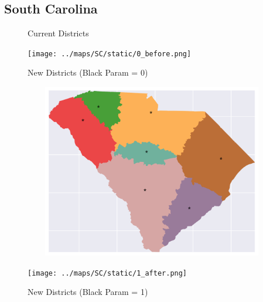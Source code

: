 \subsection{South Carolina}
\begin{figure}[htb!] \centering
\caption{ Current Districts }
\texttt{[image: ../maps/SC/static/0\_before.png]}
\caption{ New Districts (Black Param = 0) }
\includegraphics[width=5in,height=3in,keepaspectratio]{../maps/SC/static/0_after.png}
\caption{ New Districts (Black Param = 1) }
\texttt{[image: ../maps/SC/static/1\_after.png]}
\end{figure}

\clearpage
\newpage

